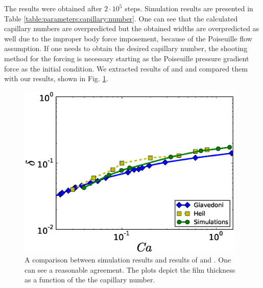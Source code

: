 \documentclass{article}
\begin{document}
The results were obtained after $2\cdot10^5$ steps. Simulation results are presented in Table
\ref{table:parameters:capillary:number}. One can see that the calculated
capillary numbers are overpredicted but the obtained widths are overpredicted
as well due to the improper body force imposement, because of the Poiseuille flow assumption. If one
needs to obtain the desired capillary number, the shooting method for the forcing is
necessary starting as the Poiseuille pressure gradient force as the initial condition. We extracted
results of 
\citet{giavedoni-numerical} and \citet{heil-bretherton} and compared them with our results, shown
in Fig. \ref{fig:capillary:comparison}.
\begin{figure}
\includegraphics[width=0.97\textwidth]{Figures/Capillary/capillaries_comparison.eps}
\caption{A comparison between simulation results and results of
\citet{giavedoni-numerical} and \citet{heil-bretherton}. One can see a
reasonable agreement. The plots depict the film thickness as a function of the
the capillary number.\label{fig:capillary:comparison}}
\end{figure}
\end{document}
